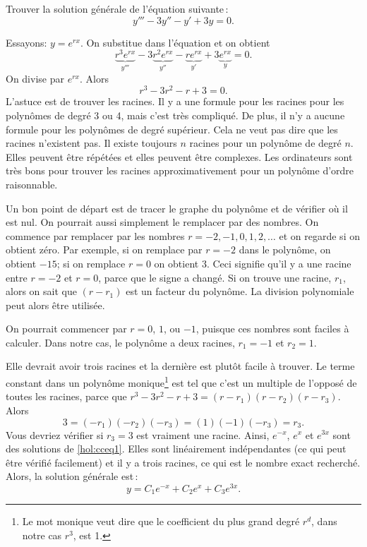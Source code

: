 \begin{example}
Trouver la solution générale de l'équation suivante\,:
\begin{equation} \label{hol:cceq1}
y''' - 3 y'' - y' + 3y = 0 .
\end{equation}

Essayons: $y = e^{rx}$. On substitue dans l'équation et on obtient\:
\begin{equation*}
\underbrace{r^3 e^{rx}}_{y'''} - 3 \underbrace{r^2 e^{rx}}_{y''} -
\underbrace{r e^{rx}}_{y'} + 3 \underbrace{e^{rx}}_{y} = 0 .
\end{equation*}
On divise par $e^{rx}$.  Alors 
\begin{equation*}
r^3 - 3 r^2 - r + 3 = 0 .
\end{equation*}
L'astuce est de trouver les racines. Il y a une formule pour les racines pour les polynômes de degré 3 ou 4, mais c'est très compliqué. De plus, il n'y a aucune formule pour les polynômes de degré supérieur. Cela ne veut pas dire que les racines n'existent pas. Il existe toujours 
$n$ racines pour un polynôme de degré  $n$.  Elles peuvent être répétées 
et elles peuvent être complexes. Les ordinateurs sont très bons pour trouver les racines approximativement pour un polynôme d'ordre  raisonnable.

Un bon point de départ est de tracer le graphe du polynôme et de vérifier où il est nul.
On pourrait aussi simplement le remplacer par des nombres. On commence par remplacer par les nombres  $r=-2,-1,0,1,2,\ldots$ et on regarde si on obtient zéro. Par exemple, si on remplace par $r=-2$ dans le polynôme, on obtient $-15$; si on remplace $r=0$ on obtient 3.
Ceci signifie qu'il y a une racine entre $r=-2$ et $r=0$,
parce que le signe a changé.
Si on trouve une racine, $r_1$, alors on sait que $(r-r_1)$ est un facteur du polynôme. La division polynomiale peut alors être utilisée. 

On pourrait commencer par $r=0$, $1$, ou $-1$, puisque ces nombres sont faciles à calculer. Dans notre cas, le polynôme a deux racines,  $r_1 = -1$
et $r_2 = 1$.  

Elle devrait avoir trois racines et la dernière est plutôt facile à trouver. Le terme constant dans un polynôme monique\footnote{Le mot monique veut dire que le coefficient du plus grand degré $r^d$, dans notre cas $r^3$, est 1.}
est tel que c'est un multiple de l'opposé de toutes les racines, parce que $r^3 - 3 r^2 - r + 3 = (r-r_1)(r-r_2)(r-r_3)$.
Alors
\begin{equation*}
3 = (-r_1)(-r_2)(-r_3) = (1)(-1)(-r_3) = r_3 .
\end{equation*}
Vous devriez vérifier si  $r_3 = 3$ est vraiment une racine.  Ainsi, $e^{-x}$, $e^{x}$
et $e^{3x}$ sont des solutions de \eqref{hol:cceq1}.  Elles sont linéairement indépendantes (ce qui peut être vérifié facilement) et il y a trois racines, ce qui est le nombre exact recherché. 
Alors, la solution générale est\,: 
\begin{equation*}
y = C_1 e^{-x} + C_2 e^{x} + C_3 e^{3x} .
\end{equation*}


\end{example}
